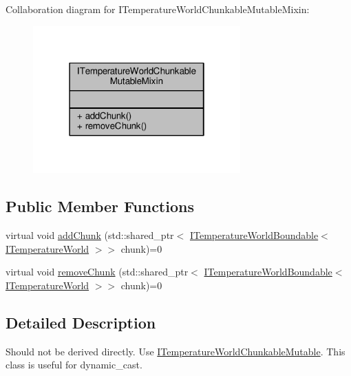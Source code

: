 Collaboration diagram for I\-Temperature\-World\-Chunkable\-Mutable\-Mixin\-:
\nopagebreak
\begin{figure}[H]
\begin{center}
\leavevmode
\includegraphics[width=226pt]{class_i_temperature_world_chunkable_mutable_mixin__coll__graph}
\end{center}
\end{figure}
\subsection*{Public Member Functions}
\begin{DoxyCompactItemize}
\item 
virtual void \hyperlink{class_i_temperature_world_chunkable_mutable_mixin_aad86bd1196ed595bcdd9025b9076085f}{add\-Chunk} (std\-::shared\-\_\-ptr$<$ \hyperlink{class_i_temperature_world_boundable}{I\-Temperature\-World\-Boundable}$<$ \hyperlink{class_i_temperature_world}{I\-Temperature\-World} $>$$>$ chunk)=0
\item 
virtual void \hyperlink{class_i_temperature_world_chunkable_mutable_mixin_a52a6ebbd24162b00566f8e5b535878f8}{remove\-Chunk} (std\-::shared\-\_\-ptr$<$ \hyperlink{class_i_temperature_world_boundable}{I\-Temperature\-World\-Boundable}$<$ \hyperlink{class_i_temperature_world}{I\-Temperature\-World} $>$$>$ chunk)=0
\end{DoxyCompactItemize}


\subsection{Detailed Description}
Should not be derived directly. Use {\ttfamily \hyperlink{class_i_temperature_world_chunkable_mutable}{I\-Temperature\-World\-Chunkable\-Mutable}}. This class is useful for {\ttfamily dynamic\-\_\-cast}. 

